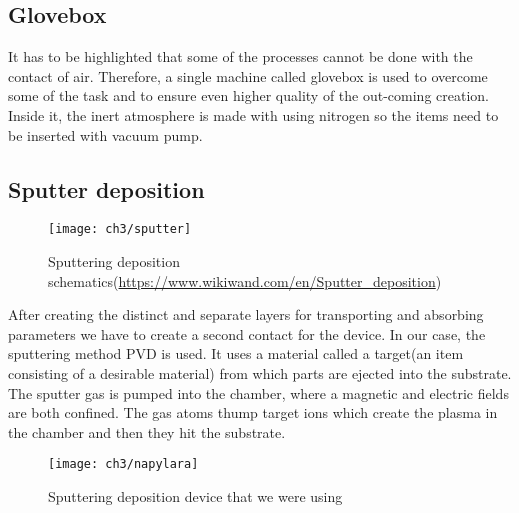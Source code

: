 \subsection{Glovebox}

It has to be highlighted that some of the processes cannot be done with the contact of air. Therefore, a single machine called glovebox is used to overcome some of the task and to ensure even higher quality of the out-coming creation. Inside it, the inert atmosphere is made with using nitrogen so the items need to be inserted with vacuum pump.
\newpage
\subsection{Sputter deposition}

\begin{wrapfigure}{r}{0.401\textwidth}
\centering
\texttt{[image: ch3/sputter]}
\caption{Sputtering deposition schematics(\url{https://www.wikiwand.com/en/Sputter_deposition})}
\end{wrapfigure}
After creating the distinct and separate layers for transporting and absorbing parameters we have to create a second contact for the device. 
In our case, the sputtering method PVD is used. It uses a material called a target(an item consisting of a desirable material) from which parts are ejected into the substrate. The sputter gas is pumped into the chamber, where a magnetic and electric fields are both confined. The gas atoms thump target ions which create the plasma in the chamber and then they hit the substrate. 

\begin{figure}[t]
  \centering
  \texttt{[image: ch3/napylara]}  
  \caption{Sputtering deposition device that we were using}
\end{figure}

